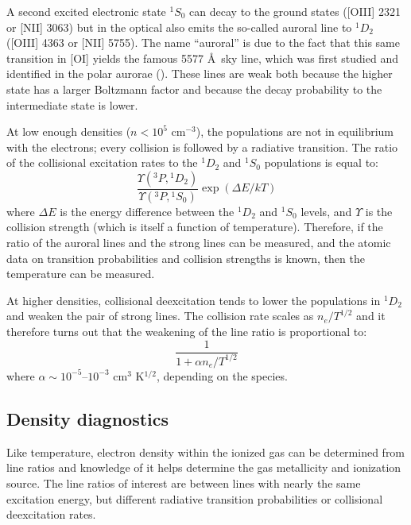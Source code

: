 A second excited electronic state ${}^1S_0$ can decay to the ground
states ([OIII] 2321 or [NII] 3063) but in the optical also emits the
so-called auroral line to ${}^1D_2$ ([OIII] 4363 or [NII] 5755). The
name ``auroral'' is due to the fact that this same transition in [OI]
yields the famous 5577 \AA\ sky line, which was first studied and
identified in the polar aurorae (\citealt{mclennan28a,
kragh09a}). These lines are weak both because the higher state has a
larger Boltzmann factor and because the decay probability to the
intermediate state is lower.

At low enough densities ($n<10^5$ cm$^{-3}$), the populations are not
in equilibrium with the electrons; every collision is followed by a
radiative transition.  The ratio of the collisional excitation rates
to the ${}^{1}D_2$ and ${}^1S_0$ populations is equal to:
\begin{equation}
\frac{\Upsilon({}^3P, {}^{1}D_2)}
{\Upsilon({}^3P, {}^1S_0)} \exp\left(\Delta E / kT \right)
\end{equation}
where $\Delta E$ is the energy difference between the ${}^{1}D_2$ and
${}^1S_0$ levels, and $\Upsilon$ is the collision strength (which is
itself a function of temperature). Therefore, if the ratio of the
auroral lines and the strong lines can be measured, and the atomic
data on transition probabilities and collision strengths is known,
then the temperature can be measured.

At higher densities, collisional deexcitation tends to lower the
 populations in ${}^{1}D_2$ and weaken the pair of strong lines. The
 collision rate scales as $n_e/T^{1/2}$ and it therefore turns out
 that the weakening of the line ratio is proportional to:
 \begin{equation}
\frac{1}{1 + \alpha n_e / T^{1/2}}
 \end{equation} where $\alpha \sim 10^{-5}$--$10^{-3}$ cm$^{3}$
K$^{1/2}$, depending on the species.

\subsection{Density diagnostics}

Like temperature, electron density within the ionized gas can be
determined from line ratios and knowledge of it helps determine the
gas metallicity and ionization source. The line ratios of interest are
between lines with nearly the same excitation energy, but different
radiative transition probabilities or collisional deexcitation rates.

